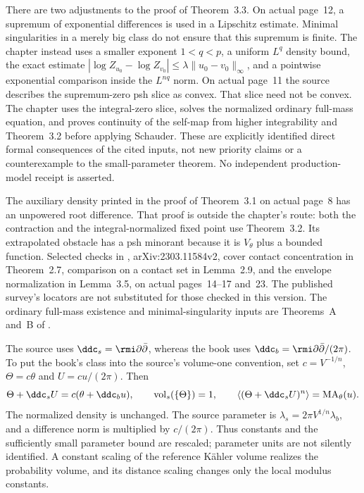 There are two adjustments to the proof of Theorem~3.3.
On actual page~12, a supremum of exponential differences is
used in a Lipschitz estimate. Minimal singularities in a merely
big class do not ensure that this supremum is finite.
The chapter instead uses a smaller exponent $1<q<p$, a uniform
$L^q$ density bound, the exact estimate
$|\log Z_{u_0}-\log Z_{v_0}|\leq\lambda\|u_0-v_0\|_\infty$,
and a pointwise exponential comparison inside the $L^{nq}$ norm.
On actual page~11 the source describes the supremum-zero psh
slice as convex. That slice need not be convex. The chapter uses
the integral-zero slice, solves the normalized ordinary full-mass
equation, and proves continuity of the self-map from higher
integrability and Theorem~3.2 before applying Schauder.
These are explicitly identified direct formal consequences of
the cited inputs, not new priority claims or a counterexample
to the small-parameter theorem. No independent production-model
receipt is asserted.

The auxiliary density printed in the proof of Theorem~3.1 on
actual page~8 has an unpowered root difference. That proof is
outside the chapter's route: both the contraction and the
integral-normalized fixed point use Theorem~3.2. Its extrapolated
obstacle has a psh minorant because it is $V_\theta$ plus a
bounded function. Selected checks in
\cite{DDL23RelativeV2}, arXiv:2303.11584v2, cover contact
concentration in Theorem~2.7, comparison on a contact set in
Lemma~2.9, and the envelope normalization in Lemma~3.5, on
actual pages~14--17 and~23. The published survey's locators
are not substituted for those checked in this version.
The ordinary full-mass existence and minimal-singularity inputs
are Theorems~A and~B of \cite{BEGZ10BigV2}.

The source uses $\ddc_s=\rmi\partial\bar\partial$, whereas
the book uses $\ddc_b=\rmi\partial\bar\partial/(2\pi)$.
To put the book's class into the source's volume-one convention,
set $c=V^{-1/n}$, $\Theta=c\theta$ and
$U=cu/(2\pi)$. Then
\[
 \Theta+\ddc_sU=c(\theta+\ddc_bu),\qquad
 \operatorname{vol}_s(\{\Theta\})=1,\qquad
 \left\langle(\Theta+\ddc_sU)^n\right\rangle
       =\operatorname{MA}_\theta(u).
\]
The normalized density is unchanged. The source parameter is
$\lambda_s=2\pi V^{1/n}\lambda_b$, and a difference norm is
multiplied by $c/(2\pi)$. Thus constants and the sufficiently
small parameter bound are rescaled; parameter units are not
silently identified. A constant scaling of the reference
K\"ahler volume realizes the probability volume, and its distance
scaling changes only the local modulus constants.

